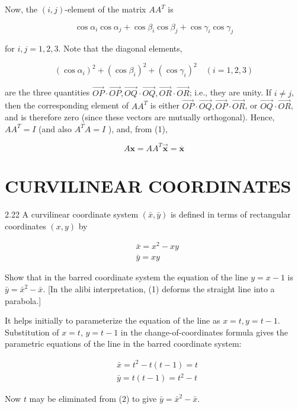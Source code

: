 \documentclass[10pt]{article}
\begin{document}
Now, the $(i, j)$-element of the matrix $A A^{T}$ is

$$
\cos \alpha_{i} \cos \alpha_{j}+\cos \beta_{i} \cos \beta_{j}+\cos \gamma_{i} \cos \gamma_{j}
$$

for $i, j=1,2,3$. Note that the diagonal elements,

$$
\left(\cos \alpha_{i}\right)^{2}+\left(\cos \beta_{i}\right)^{2}+\left(\cos \gamma_{i}\right)^{2} \quad(i=1,2,3)
$$

are the three quantities $\overrightarrow{O P} \cdot \overrightarrow{O P}, \overrightarrow{O Q} \cdot \overrightarrow{O Q}, \overrightarrow{O R} \cdot \overrightarrow{O R}$; i.e., they are unity. If $i \neq j$, then the corresponding element of $A A^{T}$ is either $\overrightarrow{O P} \cdot \overrightarrow{O Q}, \overrightarrow{O P} \cdot \overrightarrow{O R}$, or $\overrightarrow{O Q} \cdot \overrightarrow{O R}$, and is therefore zero (since these vectors are mutually orthogonal). Hence, $A A^{T}=I$ (and also $A^{T} A=I$ ), and, from (1),

$$
A \mathbf{x}=A A^{T} \overrightarrow{\mathbf{x}}=\overline{\mathbf{x}}
$$

\section*{CURVILINEAR COORDINATES}
2.22 A curvilinear coordinate system $(\bar{x}, \bar{y})$ is defined in terms of rectangular coordinates $(x, y)$ by


\begin{align*}
& \bar{x}=x^{2}-x y  \tag{1}\\
& \bar{y}=x y
\end{align*}


Show that in the barred coordinate system the equation of the line $y=x-1$ is $\bar{y}=\bar{x}^{2}-\bar{x}$. [In the alibi interpretation, (1) deforms the straight line into a parabola.]

It helps initially to parameterize the equation of the line as $x=t, y=t-1$. Substitution of $x=t$, $y=t-1$ in the change-of-coordinates formula gives the parametric equations of the line in the barred coordinate system:


\begin{align*}
& \bar{x}=t^{2}-t(t-1)=t \\
& \bar{y}=t(t-1)=t^{2}-t \tag{2}
\end{align*}


Now $t$ may be eliminated from (2) to give $\bar{y}=\bar{x}^{2}-\bar{x}$.
\end{document}
